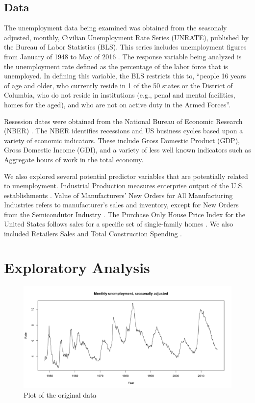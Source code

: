 \documentclass[twoside,twocolumn]{article}
\begin{document}
\subsection{Data}

The unemployment data being examined was obtained from the seasonaly adjusted, monthly, Civilian Unemployment Rate Series (UNRATE), published by the Bureau of Labor Statistics (BLS).  This series includes unemployment figures from January of 1948 to  May of 2016 \citep{blsrefsa}.  The response variable being analyzed is the unemployment rate defined as the percentage of the labor force that is unemployed.  In defining this variable, the BLS restricts this to, ``people 16 years of age and older, who currently reside in 1 of the 50 states or the District of Columbia, who do not reside in institutions (e.g., penal and mental facilities, homes for the aged), and who are not on active duty in the Armed Forces''.

Resession dates were obtained from the National Bureau of Economic Research (NBER) \citep{NBER2016}. The NBER identifies recessions and US business cycles based upon a variety of economic indicators. These include Gross Domestic Product (GDP), Gross Domestic Income (GDI), and a variety of less well known indicators such as Aggregate hours of work in the total economy.

We also explored several potential predictor variables that are potentially related to unemployment.  Industrial Production measures enterprise output of the U.S. establishments \citep{BGFS2016}. Value of Manufacturers' New Orders for All Manufacturing Industries refers to manufacturer's sales and inventory, except for New Orders from the Semicondutor Industry \citep{vmno}. The Purchase Only House Price Index for the United States follows sales for a specific set of single-family homes \citep{fhfa2016}. We also included Retailers Sales \citep{retail2016} and Total Construction Spending \citep{construction2016}.




\section{Exploratory Analysis}
		\begin{figure}[H]
		\centering
		\caption{Plot of the original data}
		\label{fig:unemployment}
		\includegraphics[width=\linewidth]{images/unemployment_total_sa}
	\end{figure}
	
\end{document}
